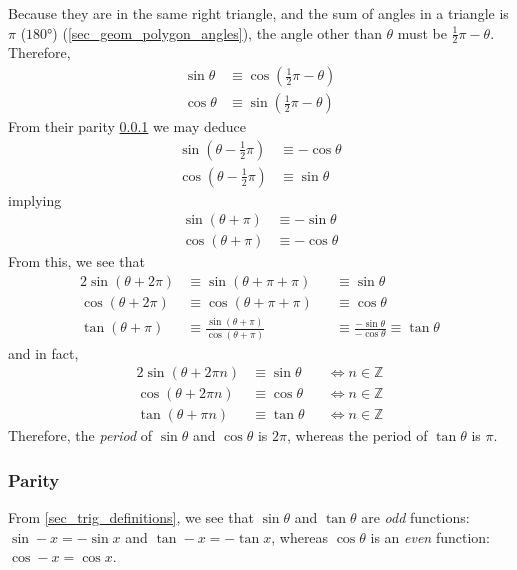 \documentclass[fleqn,a4paper,11pt]{article}
\begin{document}
    Because they are in the same right triangle, and the sum of angles in a
    triangle is \(\pi\) (\(\ang{180}\)) (\ref{sec_geom_polygon_angles}), the
    angle other than \(\theta\) must be \(\frac 12 \pi - \theta\). Therefore,
    \begin{align}
    \sin \theta &\equiv \cos(\frac 12 \pi - \theta) \\
    \cos \theta &\equiv \sin(\frac 12 \pi - \theta)
    \end{align}
    From their parity \ref{sec_trig_parity} we may deduce
    \begin{align}
    \sin(\theta - \frac 12 \pi) &\equiv -\cos \theta \\
    \cos(\theta - \frac 12 \pi) &\equiv \sin \theta
    \end{align}
    implying
    \begin{align}
    \sin(\theta + \pi) &\equiv -\sin \theta \\
    \cos(\theta + \pi) &\equiv -\cos \theta
    \end{align}
    From this, we see that
    \begin{alignat}{2}
    \sin(\theta + 2\pi) &\equiv \sin(\theta + \pi + \pi) &&\equiv \sin \theta \\
    \cos(\theta + 2\pi) &\equiv \cos(\theta + \pi + \pi) &&\equiv \cos \theta \\
    \tan(\theta + \pi) &\equiv \frac{\sin(\theta + \pi)}{\cos(\theta + \pi)}
        &&\equiv \frac{-\sin \theta}{-\cos \theta} \equiv \tan \theta
    \end{alignat}
    and in fact,
    \begin{alignat}{2}
    \sin(\theta + 2\pi n) &\equiv \sin \theta &&\iff n \in \mathbb Z \\
    \cos(\theta + 2\pi n) &\equiv \cos \theta &&\iff n \in \mathbb Z \\
    \tan(\theta + \pi n) &\equiv \tan \theta &&\iff n \in \mathbb Z
    \end{alignat}
    Therefore, the \emph{period} of \(\sin \theta\) and \(\cos \theta\) is
    \(2\pi\), whereas the period of \(\tan \theta\) is \(\pi\).

    \subsubsection{Parity} \label{sec_trig_parity}

    From \ref{sec_trig_definitions}, we see that \(\sin \theta\) and
    \(\tan \theta\) are \emph{odd} functions:
    \(\sin -x = -\sin x\) and \(\tan -x = -\tan x\),
    whereas \(\cos \theta\) is an \emph{even} function:
    \(\cos -x = \cos x\).
\end{document}
